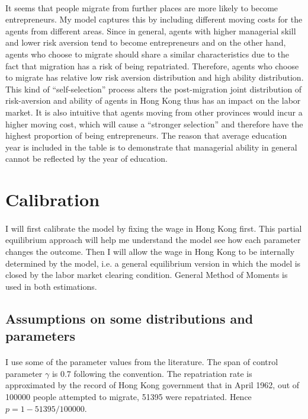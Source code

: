 \documentclass[12pt]{article}
\begin{document}
\paragraph{}
It seems that people migrate from further places are more likely to become entrepreneurs. My model captures this by including different moving costs for the agents from different areas. Since in general, agents with higher managerial skill and lower risk aversion tend to become entrepreneurs and on the other hand, agents who choose to migrate should share a similar characteristics due to the fact that migration has a risk of being repatriated. Therefore, agents who choose to migrate has relative low risk aversion distribution and high ability distribution. This kind of "`self-selection"' process alters the post-migration joint distribution of risk-aversion and ability of agents in Hong Kong thus has an impact on the labor market. It is also intuitive that agents moving from other provinces would incur a higher moving cost, which will cause a "`stronger selection"' and therefore have the highest proportion of being entrepreneurs. The reason that average education year is included in the table is to demonstrate that managerial ability in general cannot be reflected by the year of education.



\section{Calibration}
\paragraph{}
I will first calibrate the model by fixing the wage in Hong Kong first. This partial equilibrium approach will help me understand the model see how each parameter changes the outcome. Then I will allow the wage in Hong Kong to be internally determined by the model, i.e. a general equilibrium version in which the model is closed by the labor market clearing condition. General Method of Moments is used in both estimations.
\bigskip
\subsection{Assumptions on some distributions and parameters}
\paragraph{}
I use some of the parameter values from the literature. The span of control parameter $\gamma$ is 0.7 following the convention. The repatriation rate is approximated by the record of Hong Kong government that in April 1962, out of 100000 people attempted to migrate, 51395 were repatriated. Hence $p=1-51395/100000$. 
\end{document}

